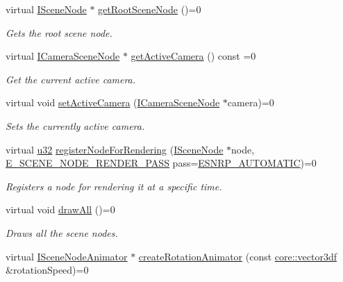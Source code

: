 \begin{DoxyCompactItemize}
virtual \hyperlink{classirr_1_1scene_1_1ISceneNode}{I\+Scene\+Node} $\ast$ \hyperlink{classirr_1_1scene_1_1ISceneManager_a4f7075320f1a3bf2838f29c23f78635f}{get\+Root\+Scene\+Node} ()=0
\begin{DoxyCompactList}\small\item\em Gets the root scene node. \end{DoxyCompactList}\item 
virtual \hyperlink{classirr_1_1scene_1_1ICameraSceneNode}{I\+Camera\+Scene\+Node} $\ast$ \hyperlink{classirr_1_1scene_1_1ISceneManager_a78585330c2c7ffae133abefd55f495b3}{get\+Active\+Camera} () const  =0
\begin{DoxyCompactList}\small\item\em Get the current active camera. \end{DoxyCompactList}\item 
virtual void \hyperlink{classirr_1_1scene_1_1ISceneManager_a5d19b7a6803a0a021082fc2b86043b3d}{set\+Active\+Camera} (\hyperlink{classirr_1_1scene_1_1ICameraSceneNode}{I\+Camera\+Scene\+Node} $\ast$camera)=0
\begin{DoxyCompactList}\small\item\em Sets the currently active camera. \end{DoxyCompactList}\item 
virtual \hyperlink{namespaceirr_a0416a53257075833e7002efd0a18e804}{u32} \hyperlink{classirr_1_1scene_1_1ISceneManager_aaf17bdde6d4e9ef61a76f3b43100ecb8}{register\+Node\+For\+Rendering} (\hyperlink{classirr_1_1scene_1_1ISceneNode}{I\+Scene\+Node} $\ast$node, \hyperlink{namespaceirr_1_1scene_a7862269bd1abc123929d4dbb8200d67f}{E\+\_\+\+S\+C\+E\+N\+E\+\_\+\+N\+O\+D\+E\+\_\+\+R\+E\+N\+D\+E\+R\+\_\+\+P\+A\+SS} pass=\hyperlink{namespaceirr_1_1scene_a7862269bd1abc123929d4dbb8200d67fa5ceee6e4bc2fab42c663b32018e276e8}{E\+S\+N\+R\+P\+\_\+\+A\+U\+T\+O\+M\+A\+T\+IC})=0
\begin{DoxyCompactList}\small\item\em Registers a node for rendering it at a specific time. \end{DoxyCompactList}\item 
virtual void \hyperlink{classirr_1_1scene_1_1ISceneManager_a04240262904667c821bd9de5e5fd9b02}{draw\+All} ()=0
\begin{DoxyCompactList}\small\item\em Draws all the scene nodes. \end{DoxyCompactList}\item 
virtual \hyperlink{classirr_1_1scene_1_1ISceneNodeAnimator}{I\+Scene\+Node\+Animator} $\ast$ \hyperlink{classirr_1_1scene_1_1ISceneManager_a29efe9505de4e5dc2218283ef0c2a64d}{create\+Rotation\+Animator} (const \hyperlink{namespaceirr_1_1core_a06f169d08b5c429f5575acb7edbad811}{core\+::vector3df} \&rotation\+Speed)=0

\end{DoxyCompactItemize}
